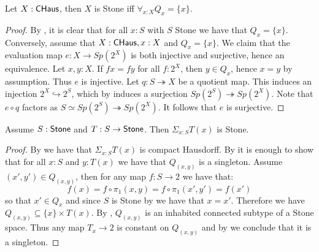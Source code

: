 \begin{lemma}\label{StoneCompactHausdorffTotallyDisconnected}
Let $X:\mathsf{CHaus}$, then $X$ is Stone iff $\forall_{x:X}Q_x=\{x\}$.
\end{lemma}

\begin{proof}
  By , it is clear that for all $x:S$ with $S$ Stone we have that $Q_x=\{x\}$.
%
  Conversely, assume that $X:\mathsf{CHaus}, x : X$ and $Q_x = \{x\}$.
  We claim that the evaluation map $e:X \to Sp(2^X)$ is both injective and surjective, hence an equivalence. 
    Let $x,y:X$. If $fx = fy $ for all $f:2^X$, then $y \in Q_x$, hence $ x= y$ by assumption. 
    Thus $e$ is injective. 
    Let $q:S\twoheadrightarrow X$ be a quotient map. 
    This induces an injection $2^X \hookrightarrow 2^S$, which by 
    induces a surjection $Sp(2^S) \twoheadrightarrow Sp(2^X)$. 
    Note that $e\circ q$ factors as $S\simeq Sp(2^S) \twoheadrightarrow Sp(2^X)$. 
    It follows that $e$ is surjective. 
%
%
%
\end{proof}

\begin{theorem}
  \label{stone-sigma-closed}
Assume $S:\mathsf{Stone}$ and $T:S\to\mathsf{Stone}$. Then $\Sigma_{x:S}T(x)$ is Stone.
\end{theorem}

\begin{proof}
By  we have that $\Sigma_{x:S}T(x)$ is compact Hausdorff. 
By  
it is enough to show that for all $x:S$ and $y:T(x)$ 
we have that $Q_{(x,y)}$ is a singleton.
%
Assume $(x',y')\in Q_{(x,y)}$, then for any map $f:S\to 2$ we have that:
$$ f(x) = f\circ \pi_1(x,y) = f\circ \pi_1(x',y') = f(x')$$
so that $x'\in Q_x$ and since $S$ is Stone by  we have that $x=x'$.
%
Therefore we have $Q_{(x,y)}\subseteq \{x\}\times T(x)$. 
By , $Q_{(x,y)}$ is an inhabited 
connected subtype of a Stone space. 
Thus any map $T_x\to 2$ is constant on $Q_{(x,y)}$ and by 
 we conclude that it is a singleton.
\end{proof}


